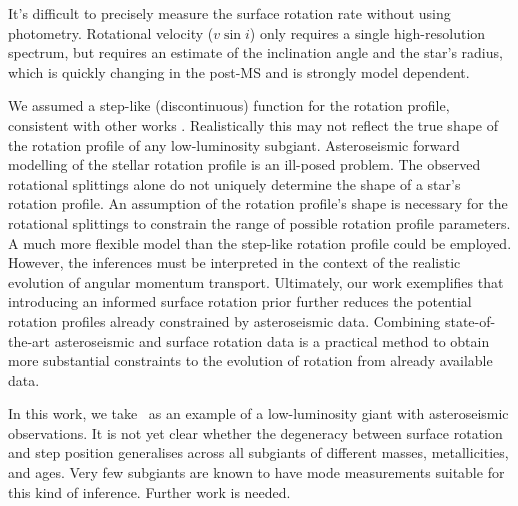 It's difficult to precisely measure the surface rotation rate without using photometry. Rotational velocity ($v\sin i$) only requires a single high-resolution spectrum, but requires an estimate of the inclination angle and the star's radius, 
which is quickly changing in the post-MS and is strongly model dependent. 



We assumed a step-like (discontinuous) function for the rotation profile, consistent with other works \citep[e.g.,][]{fellay_asteroseismology_2021}. Realistically this may not reflect the true shape of the rotation profile of any low-luminosity subgiant. Asteroseismic forward modelling of the stellar rotation profile is an ill-posed problem. The observed rotational splittings alone do not uniquely determine the shape of a star's rotation profile. An assumption of the rotation profile's shape is necessary for the rotational splittings to constrain the range of possible rotation profile parameters. A much more flexible model than the step-like rotation profile could be employed. However, the inferences must be interpreted in the context of the realistic evolution of angular momentum transport. Ultimately, our work exemplifies that introducing an informed surface rotation prior further reduces the potential rotation profiles already constrained by asteroseismic data. Combining state-of-the-art asteroseismic and surface rotation data is a practical method to obtain more substantial constraints to the evolution of rotation from already available data.

In this work, we take \thestar\ as an example of a low-luminosity giant with asteroseismic observations. 
It is not yet clear whether the degeneracy between surface rotation and step position generalises across all subgiants of different masses, metallicities, and ages. Very few subgiants are known to have mode measurements suitable for this kind of inference. Further work is needed.

